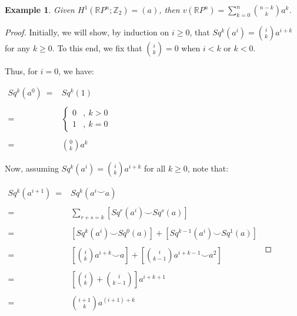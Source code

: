 \documentclass[12pt,oneside]{book}
\newtheorem{ex}     {Example}[chapter]
\newcommand{\ds}{\displaystyle}
\newcommand{\RP}{\mathbb{R}P}
\newcommand{\Z}{\mathbb{Z}}
\newcommand{\ccup}{\smile}
\begin{document}
    \begin{ex}\label{wu_rpn}
    Given $H^{1}(\RP^{n};\Z_{2})=(a)$, then $v(\RP^{n})=\ds\sum_{k=0}^{n}\binom{n-k}{k} a^{k}$.
    \end{ex}
    \begin{proof}
    
    Initially, we will show, by induction on $i\geq 0$, that $Sq^{k}(a^{i})=\binom{i}{k}a^{i+k}$ for any $k\geq 0$. To this end, we fix that 
    $\binom{i}{k}=0$ when $i<k$ or $k<0$.
    
    Thus, for $i=0$, we have: \newline
    
    $\begin{array}{rl}
        Sq^{k}(a^{0}) \ = & Sq^{k}(1) \\
        & \\
        = & \left\{ \begin{array}{cl}
            0 & , \ k>0 \\
            1 & , \ k=0
        \end{array} \right. \\
        & \\
        = & \binom{0}{k}a^{k}
    \end{array}$ \newline
    
    Now, assuming $Sq^{k}(a^{i})=\binom{i}{k}a^{i+k}$ for all $k\geq 0$, note that: \newline
    
    $\begin{array}{rl}
        Sq^{k}(a^{i+1}) \ = & Sq^{k}(a^{i}\ccup a) \\
        & \\
        = & \ds\sum_{r+s=k}\left[ Sq^{r}(a^{i})\ccup Sq^{s}(a)\right] \\
        & \\
        = & \left[ Sq^{k}(a^{i})\ccup Sq^{0}(a)\right]+\left[ Sq^{k-1}(a^{i})\ccup Sq^{1}(a)\right] \\
        & \\
        = & \left[ \binom{i}{k}a^{i+k}\ccup a\right]+\left[ \binom{i}{k-1}a^{i+k-1}\ccup a^{2}\right] \\
        & \\
        = & \left[ \binom{i}{k}+\binom{i}{k-1}\right]a^{i+k+1} \\
        & \\
        = & \binom{i+1}{k}a^{(i+1)+k}
    \end{array}$ \newline


\end{proof}
\end{document}
